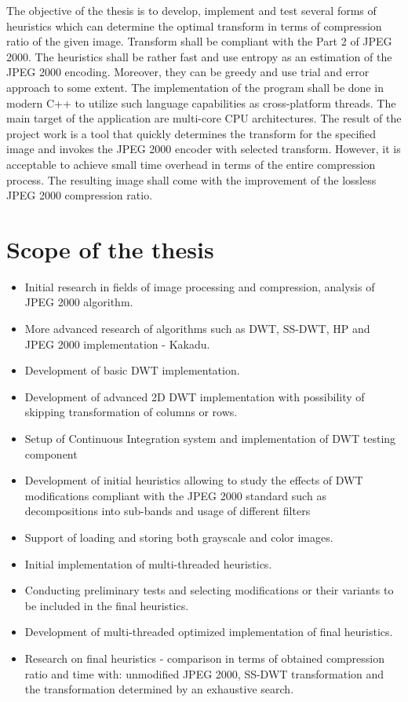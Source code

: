 The objective of the thesis is to develop, implement and test several forms of heuristics which can determine
the optimal transform in terms of compression ratio of the given image. Transform shall be compliant with
the Part 2 of JPEG 2000. The heuristics shall be rather fast and use entropy as an estimation of the JPEG 2000 encoding.
Moreover, they can be greedy and use trial and error approach to some extent. The implementation of the program
shall be done in modern C++ to utilize such language capabilities as cross-platform threads. The main target of the
application are multi-core CPU architectures. The result of the project work is a tool that quickly determines 
the transform for the specified image and invokes the JPEG 2000 encoder with selected transform. However, it is acceptable
to achieve small time overhead in terms of the entire compression process. The resulting image shall come with the
improvement of the lossless JPEG 2000 compression ratio.

\section{Scope of the thesis}

\begin{itemize}
    \item Initial research in fields of image processing and compression, analysis of JPEG 2000 algorithm. 
    \item More advanced research of algorithms such as DWT, SS-DWT, HP and JPEG 2000 implementation - Kakadu.
    \item Development of basic DWT implementation.
    \item Development of advanced 2D DWT implementation with possibility of skipping transformation of columns or rows.
    \item Setup of Continuous Integration system and implementation of DWT testing component 
    \item Development of initial heuristics allowing to study the effects of DWT modifications compliant
    with the JPEG 2000 standard such as decompositions into sub-bands and usage of different filters
    \item Support of loading and storing both grayscale and color images.
    \item Initial implementation of multi-threaded heuristics.
    \item Conducting preliminary tests and selecting modifications or their variants to be included in the final heuristics.
    \item Development of multi-threaded optimized implementation of final heuristics.
    \item Research on final heuristics - comparison in terms of obtained compression ratio and time with: unmodified JPEG 2000,
    SS-DWT transformation and the transformation determined by an exhaustive search.
\end{itemize}


